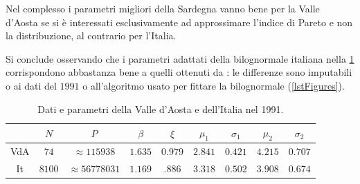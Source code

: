       Nel complesso i parametri migliori della Sardegna vanno bene per la Valle d'Aosta se si è interessati esclusivamente ad approssimare l'indice di Pareto e non la distribuzione, al contrario per l'Italia.

      Si conclude osservando che i parametri adattati della bilognormale italiana nella \cref{tabDatiParametriValledAostaItalia} corrispondono abbastanza bene a quelli ottenuti da \cite[Tab. 6.2 p. 230]{Gualandi2019SDC}: le differenze sono imputabili o ai dati del \(1991\) o all'algoritmo usato per fittare la bilognormale (\cref{lstFigures}).

      \begin{table}[t]%
        \centering
        \caption{Dati \cite{ISTATCensimento1991,ISTATPendolarismo1991} e parametri della Valle d'Aosta e dell'Italia nel 1991.}
        \begin{tabular}{ccccccccc}
          \hline
          &\(N\)&\(P\)&\(\beta\)&\(\xi\)&
          \(\mu_1\)&\(\sigma_1\)&\(\mu_2\)&\(\sigma_2\)\\
          \hline
          VdA&\(\num{74}\)&\(\approx\num{115938}\)&\(\num{1.635}\)&\(\num{0.979}\)&
          \(\num{2.841}\)&\(\num{0.421}\)&\(\num{4.215}\)&\(\num{0.707}\)\\
          It&\(\num[exponent-mode=input]{8100}\)&\(\approx\num{56778031}\)&\(\num{1.169}\)&\(\num{.886}\)&
          \(\num{3.318}\)&\(\num{0.502}\)&\(\num{3.908}\)&\(\num{0.674}\)\\
          \hline
        \end{tabular}
        \label{tabDatiParametriValledAostaItalia}
      \end{table}
      
